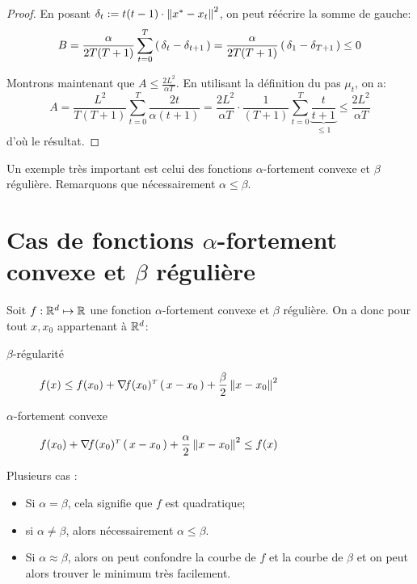 \begin{proof}
En posant $\delta_t := t(t-1) \cdot \norme{x^{*}-x_t}^2$, on peut réécrire la somme
 de gauche:
\begin{equation*}
B= \frac{\alpha}{2T(T+1)} \sum_{t=0}^T \left( \, \delta_t-\delta_{t+1} \, \right)
=\frac{\alpha}{2T(T+1)} \left( \, \delta_1-\delta_{T+1} \, \right)
\leq 0
\end{equation*}

Montrons maintenant que $A \leq \frac{2 L^2}{\alpha T}$. En utilisant la définition
 du pas $\mu_t$, on a:
 \begin{equation*}
   A= \frac{L^2}{T(T+1)} \sum_{t=0}^T \frac{2t}{\alpha (t+1)}
   = \frac{2L^2}{\alpha T} \cdot  \frac{1}{(T+1)}\sum_{t=0}^T \underbrace{\frac{t}{t+1}}_{\leq 1} \leq \frac{2L^2}{\alpha T}
 \end{equation*}
d'où le résultat.
\end{proof}

Un exemple très important est celui des fonctions $\alpha$-fortement convexe et
 $\beta$ régulière. Remarquons que nécessairement $\alpha \leq \beta$.

 \section{Cas de fonctions $\alpha$-fortement convexe et
  $\beta$ régulière}

  Soit $f: \mathbb{R}^d \mapsto \mathbb{R}$ une fonction $\alpha$-fortement convexe et
   $\beta$ régulière. On a donc pour tout $x, x_0$ appartenant à $\mathbb{R}^d$:
   \begin{description}
     \item[$\beta$-régularité] $\displaystyle f(x) \leq f(x_0)+ \transpose{\nabla\! f(x_0)}\prt{x-x_0}+ \frac{\beta}{2}\norme{x-x_0}^2$
     \item[$\alpha$-fortement convexe] $\displaystyle f(x_0)+ \transpose{\nabla\! f(x_0)}\prt{x-x_0}+ \frac{\alpha}{2}\norme{x-x_0}^2 \leq  f(x) $
   \end{description}

   Plusieurs cas :
   \begin{itemize}
     \item Si $\alpha=\beta$, cela signifie que $f$ est quadratique;
     \item si $\alpha \neq \beta$, alors nécessairement $\alpha \leq \beta$.
     \item Si $\alpha \approx \beta$, alors on peut confondre la courbe de $f$ et
     la courbe de $\beta$ et on peut alors trouver le minimum très facilement.
   \end{itemize}


